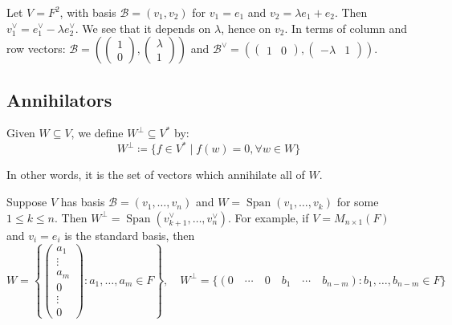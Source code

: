 \documentclass[../linear_algebra_and_groups.tex]{subfiles}
\begin{document}
\begin{example}
    Let $V = F^2$, with basis $\mathcal{B} = (v_1, v_2)$ for $v_1 = e_1$ and $v_2 = \lambda e_1 + e_2$. Then $v_1^\vee = e_1^\vee - \lambda e_2^\vee$. We see that it depends on $\lambda$, hence on $v_2$. 
    In terms of column and row vectors: $\mathcal{B} = \left( \begin{pmatrix} 1 \\ 0 \end{pmatrix}, \begin{pmatrix} \lambda \\ 1 \end{pmatrix} \right)$ and $\mathcal{B}^\vee = \left( \begin{pmatrix} 1 & 0 \end{pmatrix}, \begin{pmatrix} -\lambda & 1 \end{pmatrix} \right)$.
\end{example}



\subsection{Annihilators}

\begin{definition}
    \begin{shaded*}
        Given $W \subseteq V$, we define $W^\perp \subseteq V^*$ by:
        \[ W^\perp \coloneqq \{f \in V^* \mid f(w) = 0, \forall w \in W\} \]
    \end{shaded*}
\end{definition}
In other words, it is the set of vectors which annihilate all of $W$.

\begin{example}
    Suppose $V$ has basis $\mathcal{B} = (v_1, \dots, v_n)$ and $W = \operatorname{Span}(v_1, \dots, v_k)$ for some $1 \le k \le n$. Then $W^\perp = \operatorname{Span}(v_{k+1}^\vee, \dots, v_n^\vee)$. For example, if $V = M_{n\times 1}(F)$ and $v_i = e_i$ is the standard basis, then
    \[ 
    W = \left\{ \begin{pmatrix} a_1 \\ \vdots \\ a_m \\ 0 \\ \vdots \\ 0 \end{pmatrix} : a_1, \dots, a_m \in F \right\}, \quad W^\perp = \{(0 \quad \cdots \quad 0 \quad b_1 \quad \cdots \quad b_{n-m}) : b_1, \dots, b_{n-m} \in F\} 
    \]
\end{example}
\end{document}
